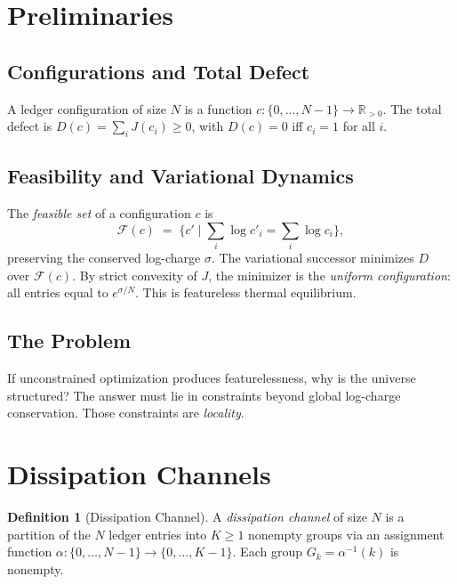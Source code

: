 \documentclass[11pt,a4paper]{article}
\theoremstyle{plain}
\theoremstyle{definition}
\newtheorem{definition}[theorem]{Definition}
\theoremstyle{remark}
\newcommand{\R}{\mathbb{R}}
\newcommand{\Jcost}{J}
\newcommand{\F}{\mathcal{F}}
\begin{document}
\section{Preliminaries}\label{sec:prelim}

\subsection{Configurations and Total Defect}

A ledger configuration of size $N$ is a function $c : \{0,\ldots,N{-}1\} \to \R_{>0}$.
The total defect is $D(c) = \sum_{i} \Jcost(c_i) \ge 0$, with $D(c) = 0$ iff $c_i = 1$ for all $i$.

\subsection{Feasibility and Variational Dynamics}

The \emph{feasible set} of a configuration $c$ is
\[
\F(c) \;=\; \bigl\{c' \mid \textstyle\sum_i \log c'_i = \sum_i \log c_i\bigr\},
\]
preserving the conserved log-charge $\sigma$.
The variational successor minimizes $D$ over $\F(c)$.
By strict convexity of $\Jcost$, the minimizer is the \emph{uniform configuration}: all entries equal to $e^{\sigma/N}$.
This is featureless thermal equilibrium.

\subsection{The Problem}

If unconstrained optimization produces featurelessness, why is the universe structured?
The answer must lie in constraints beyond global log-charge conservation.
Those constraints are \emph{locality}.

\section{Dissipation Channels}\label{sec:channels}

\begin{definition}[Dissipation Channel]\label{def:channel}
A \emph{dissipation channel} of size $N$ is a partition of the $N$ ledger entries into $K \ge 1$ nonempty groups via an assignment function $\alpha : \{0,\ldots,N{-}1\} \to \{0,\ldots,K{-}1\}$.
Each group $G_k = \alpha^{-1}(k)$ is nonempty.
\end{definition}
\end{document}
